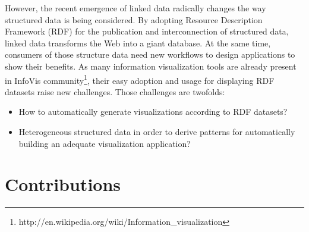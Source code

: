 However, the recent emergence of linked data radically changes the way structured data is being considered. By adopting  Resource Description Framework (RDF) for the publication and interconnection of structured data, linked data transforms the Web into a giant database. At the same time, consumers of those structure data need new workflows  to design applications to show their benefits. As many information visualization tools are already present in InfoVis community\footnote{http://en.wikipedia.org/wiki/Information\_visualization}, their easy adoption and usage for displaying RDF datasets raise new challenges. Those challenges are twofolds:
\begin{itemize}
\item How to automatically generate visualizations according to  RDF datasets?
\item Heterogeneous structured data in order to derive patterns for automatically building an adequate visualization application?
\end{itemize}


\section{Contributions}
\label{sec:contributions}

